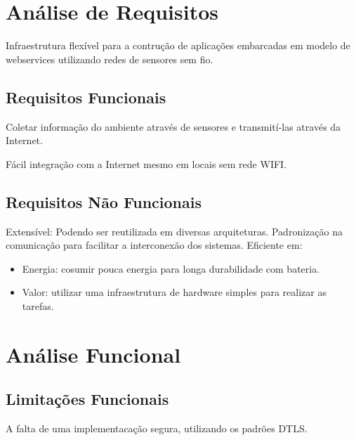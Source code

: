 \section{An\'alise de Requisitos}

Infraestrutura flex\'ivel para a contru\c{c}\~ao de aplica\c{c}\~oes embarcadas em modelo de webservices utilizando redes de sensores sem fio.

\subsection{Requisitos Funcionais}{
Coletar informa\c{c}\~ao do ambiente atrav\'es de sensores e transmit\'i-las atrav\'es da Internet.

F\'acil integra\c{c}\~ao com a Internet mesmo em locais sem rede WIFI.
}


\subsection{Requisitos N\~ao Funcionais}{

Extens\'ivel: Podendo ser reutilizada em diversas arquiteturas.
Padroniza\c{c}\~ao na comunica\c{c}\~ao para facilitar a interconex\~ao dos sistemas.
Eficiente em:
    \begin{itemize}
        \item Energia: cosumir pouca energia para longa durabilidade com bateria.
        \item Valor: utilizar uma infraestrutura de hardware simples para realizar as tarefas.
    \end{itemize}
}
\section{An\'alise Funcional}
\subsection{Limita\c{c}\~oes Funcionais}
A falta de uma implementaca\c{c}\~ao segura, utilizando os padr\~oes DTLS.
